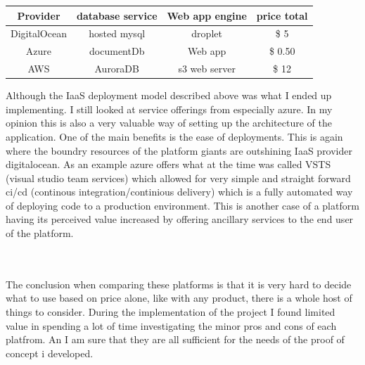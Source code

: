 \documentclass[]{uiophd}
\begin{document}
\begin{center}
 \begin{tabular}{||c | c | c | c ||} 
 \hline
 Provider & database service & Web app engine & price total \\ [0.5ex] 
 \hline\hline
 DigitalOcean & hosted mysql & droplet & \$ 5  \\ 
 \hline
 Azure & documentDb & Web app & \$ 0.50 \\
 \hline
 AWS & AuroraDB & s3 web server &\$ 12 \\
 \hline
\end{tabular}
\end{center}

Although the IaaS deployment model described above was what I ended up implementing. I still looked at service offerings from especially azure. In my opinion this is also a very valuable way of setting up the architecture of the application. One of the main benefits is the ease of deployments. This is again where the boundry resources of the platform giants are outshining IaaS provider digitalocean. As an example azure offers what at the time was called VSTS (visual studio team services) which allowed for very simple and straight forward ci/cd (continous integration/continious delivery) which is a fully automated way of deploying code to a production environment. This is another case of a platform having its perceived value increased by offering ancillary services to the end user of the platform. 

\\\\
The conclusion when comparing these platforms is that it is very hard to decide what to use based on price alone, like with any product, there is a whole host of things to consider. During the implementation of the project I found limited value in spending a lot of time investigating the minor pros and cons of each platfrom. An I am sure that they are all sufficient for the needs of the proof of concept i developed.
\end{document}
